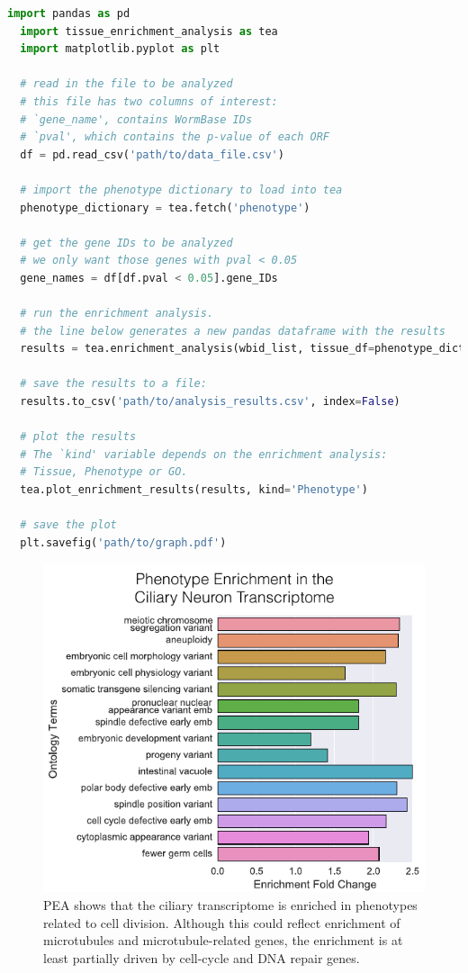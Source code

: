 \documentclass[10pt, onecolumn]{article}
\begin{document}
\begin{lstlisting}[language=Python, caption=Brief programmatic example of how
to perform a complete phentoype enrichment analysis in Python., label={code}]
  import pandas as pd
  import tissue_enrichment_analysis as tea
  import matplotlib.pyplot as plt

  # read in the file to be analyzed
  # this file has two columns of interest:
  # `gene_name', contains WormBase IDs
  # `pval', which contains the p-value of each ORF
  df = pd.read_csv('path/to/data_file.csv')

  # import the phenotype dictionary to load into tea
  phenotype_dictionary = tea.fetch('phenotype')

  # get the gene IDs to be analyzed
  # we only want those genes with pval < 0.05
  gene_names = df[df.pval < 0.05].gene_IDs

  # run the enrichment analysis.
  # the line below generates a new pandas dataframe with the results
  results = tea.enrichment_analysis(wbid_list, tissue_df=phenotype_dictionary)

  # save the results to a file:
  results.to_csv('path/to/analysis_results.csv', index=False)

  # plot the results
  # The `kind' variable depends on the enrichment analysis:
  # Tissue, Phenotype or GO.
  tea.plot_enrichment_results(results, kind='Phenotype')

  # save the plot
  plt.savefig('path/to/graph.pdf')
\end{lstlisting}




\begin{figure}[htbp]
  \renewcommand{\familydefault}{\sfdefault}\normalfont{}
  \centering
  \includegraphics[width=.5\linewidth]{ciliary-transcriptome.pdf}
  \caption{PEA shows that the ciliary transcriptome is enriched in phenotypes
  related to cell division. Although this could reflect enrichment of
  microtubules and microtubule-related genes, the enrichment is at least
  partially driven by cell-cycle and DNA repair genes.}
\label{fig:cilia}
\end{figure}
\end{document}
